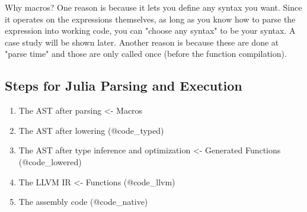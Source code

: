 \documentclass[11pt]{article}
\providecommand{\tightlist}{%
      \setlength{\itemsep}{0pt}\setlength{\parskip}{0pt}}
\begin{document}
Why macros? One reason is because it lets you define any syntax you
want. Since it operates on the expressions themselves, as long as you
know how to parse the expression into working code, you can "choose any
syntax" to be your syntax. A case study will be shown later. Another
reason is because these are done at "parse time" and those are only
called once (before the function compilation).

    \subsection{Steps for Julia Parsing and
Execution}\label{steps-for-julia-parsing-and-execution}

\begin{enumerate}
\def\labelenumi{\arabic{enumi}.}
\tightlist
\item
  The AST after parsing \textless{}- Macros
\item
  The AST after lowering (@code\_typed)
\item
  The AST after type inference and optimization \textless{}- Generated
  Functions (@code\_lowered)
\item
  The LLVM IR \textless{}- Functions (@code\_llvm)
\item
  The assembly code (@code\_native)
\end{enumerate}


    
    
    
    
\end{document}
